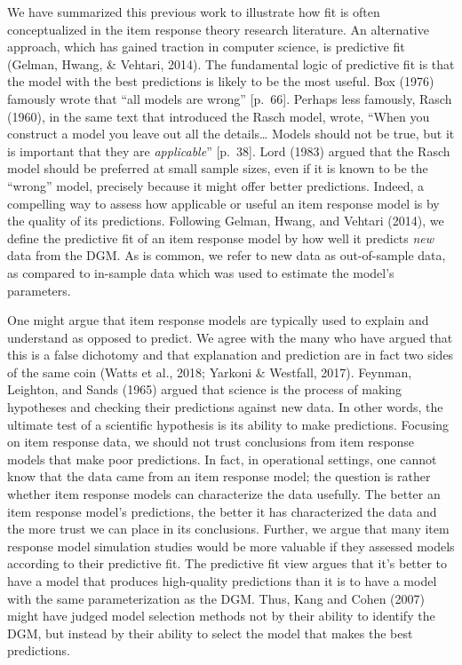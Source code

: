 \documentclass[
  english,
  man,floatsintext]{apa7}
\begin{document}
We have summarized this previous work to illustrate how fit is often conceptualized in the item response theory research literature. An alternative approach, which has gained traction in computer science, is predictive fit (Gelman, Hwang, \& Vehtari, 2014). The fundamental logic of predictive fit is that the model with the best predictions is likely to be the most useful. Box (1976) famously wrote that ``all models are wrong'' {[}p.~66{]}. Perhaps less famously, Rasch (1960), in the same text that introduced the Rasch model, wrote, ``When you construct a model you leave out all the details\ldots{} Models should not be true, but it is important that they are \emph{applicable}'' {[}p.~38{]}. Lord (1983) argued that the Rasch model should be preferred at small sample sizes, even if it is known to be the ``wrong'' model, precisely because it might offer better predictions. Indeed, a compelling way to assess how applicable or useful an item response model is by the quality of its predictions. Following Gelman, Hwang, and Vehtari (2014), we define the predictive fit of an item response model by how well it predicts \emph{new} data from the DGM. As is common, we refer to new data as out-of-sample data, as compared to in-sample data which was used to estimate the model's parameters.

One might argue that item response models are typically used to explain and understand as opposed to predict. We agree with the many who have argued that this is a false dichotomy and that explanation and prediction are in fact two sides of the same coin (Watts et al., 2018; Yarkoni \& Westfall, 2017). Feynman, Leighton, and Sands (1965) argued that science is the process of making hypotheses and checking their predictions against new data. In other words, the ultimate test of a scientific hypothesis is its ability to make predictions. Focusing on item response data, we should not trust conclusions from item response models that make poor predictions. In fact, in operational settings, one cannot know that the data came from an item response model; the question is rather whether item response models can characterize the data usefully. The better an item response model's predictions, the better it has characterized the data and the more trust we can place in its conclusions. Further, we argue that many item response model simulation studies would be more valuable if they assessed models according to their predictive fit. The predictive fit view argues that it's better to have a model that produces high-quality predictions than it is to have a model with the same parameterization as the DGM. Thus, Kang and Cohen (2007) might have judged model selection methods not by their ability to identify the DGM, but instead by their ability to select the model that makes the best predictions.
\end{document}
